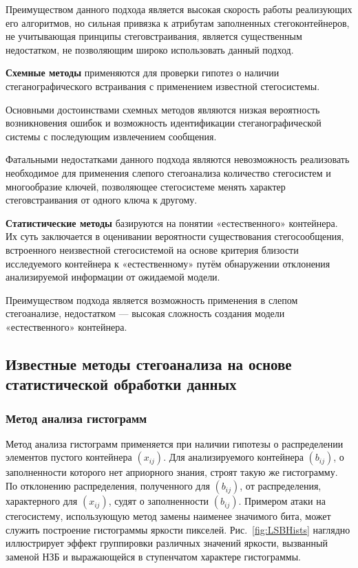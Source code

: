 Преимуществом данного подхода является высокая скорость работы реализующих его алгоритмов, но сильная привязка к атрибутам заполненных стегоконтейнеров, не учитывающая принципы стеговстраивания, является существенным недостатком, не позволяющим широко использовать данный подход.

\textbf{Схемные методы} применяются для проверки гипотез о наличии стеганографического встраивания с применением известной стегосистемы.

Основными достоинствами схемных методов являются низкая вероятность возникновения ошибок и возможность идентификации стеганографической системы с последующим извлечением сообщения.

Фатальными недостатками данного подхода являются невозможность реализовать необходимое для применения слепого стегоанализа количество стегосистем и многообразие ключей, позволяющее стегосистеме менять характер стеговстраивания от одного ключа к другому.

\textbf{Статистические методы} базируются на понятии «естественного» контейнера. Их суть заключается в оценивании вероятности существования стегосообщения, встроенного неизвестной стегосистемой на основе критерия близости исследуемого контейнера к «естественному» путём обнаружении отклонения анализируемой информации от ожидаемой модели.

Преимуществом подхода является возможность применения в слепом стегоанализе, недостатком — высокая сложность создания модели «естественного» контейнера.

\subsection{Известные методы стегоанализа на основе статистической обработки данных}

\subsubsection{Метод анализа гистограмм}

Метод анализа гистограмм применяется при наличии гипотезы о распределении элементов пустого контейнера $ (x_{ij}) $. Для анализируемого контейнера $ (b_{ij}) $, о заполненности которого нет априорного знания, строят такую же гистограмму. По отклонению распределения, полученного для $ (b_{ij}) $, от распределения, характерного для $ (x_{ij}) $, судят о заполненности $ (b_{ij}) $. Примером атаки на стегосистему, использующую метод замены наименее значимого бита, может служить построение гистограммы яркости пикселей. Рис.~\ref{fig:LSBHists} наглядно иллюстрирует эффект группировки различных значений яркости, вызванный заменой НЗБ и выражающейся в ступенчатом характере гистограммы.

